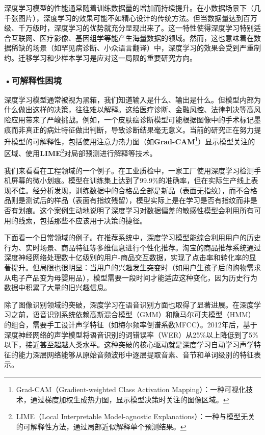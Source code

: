深度学习模型的性能通常随着训练数据量的增加而持续提升。在小数据场景下（几千张图片），深度学习的效果可能不如精心设计的传统方法。但当数据量达到百万级、千万级时，深度学习的优势就充分显现出来了。这一特性使得深度学习特别适合互联网、医疗影像、基因组学等能产生海量数据的领域。然而，这也意味着在数据稀缺的场景（如罕见病诊断、小众语言翻译）中，深度学习的效果会受到严重制约。迁移学习和少样本学习是应对这一局限的重要研究方向。

\subsubsection*{\textbf{•可解释性困境}}

深度学习模型通常被视为黑箱，我们知道输入是什么、输出是什么。但模型内部为什么做出这样的决策，往往难以解释。这给医疗诊断、金融风控、法律判决等高风险应用带来了严峻挑战。例如，一个皮肤癌诊断模型可能根据图像中的手术标记墨痕而非真正的病灶特征做出判断，导致诊断结果毫无意义。当前的研究正在努力提升模型的可解释性，包括使用注意力热力图（如\textbf{Grad-CAM}\footnote{Grad-CAM（Gradient-weighted Class Activation Mapping）：一种可视化技术，通过梯度加权生成热力图，显示模型决策时关注的图像区域。}）显示模型关注的区域、使用\textbf{LIME}\footnote{LIME（Local Interpretable Model-agnostic Explanations）：一种与模型无关的可解释性方法，通过局部近似解释单个预测结果。}对局部预测进行解释等技术。

我们来看看在工程领域的一个例子。在工业质检中，一家工厂使用深度学习检测手机屏幕的微小划痕。模型在训练集上达到了99.9\%的准确率，但在实际生产线上表现不佳。经分析发现，训练数据中的合格品全部是新品（表面无指纹），而不合格品则是测试后的样品（表面有指纹残留），模型实际上是在学习是否有指纹而非是否有划痕。这个案例生动地说明了深度学习对数据偏差的敏感性模型会利用所有可用的线索，包括那些不应该用于决策的捷径。

下面看一个日常领域的例子。在推荐系统中，深度学习模型能综合利用用户的历史行为、实时场景、商品特征等多维信息进行个性化推荐。淘宝的商品推荐系统通过深度神经网络处理数十亿级别的用户-商品交互数据，实现了点击率和转化率的显著提升。但局限也很明显：当用户的兴趣发生突变时（如用户生孩子后的购物需求从电子产品变为母婴用品），模型需要一段时间才能适应这种变化，因为历史行为数据中积累了大量的旧兴趣信息。

除了图像识别领域的突破，深度学习在语音识别方面也取得了显著进展。在深度学习之前，语音识别系统依赖高斯混合模型（GMM）和隐马尔可夫模型（HMM）的组合，需要手工设计声学特征（如梅尔频率倒谱系数MFCC）。2012年后，基于深度神经网络的声学模型将语音识别的词错误率（WER）从25\%以上降低到了5\%以下，接近甚至超越人类水平。这种突破的核心驱动就是深度学习自动学习声学特征的能力深层网络能够从原始音频波形中逐层提取音素、音节和单词级别的特征表示。


